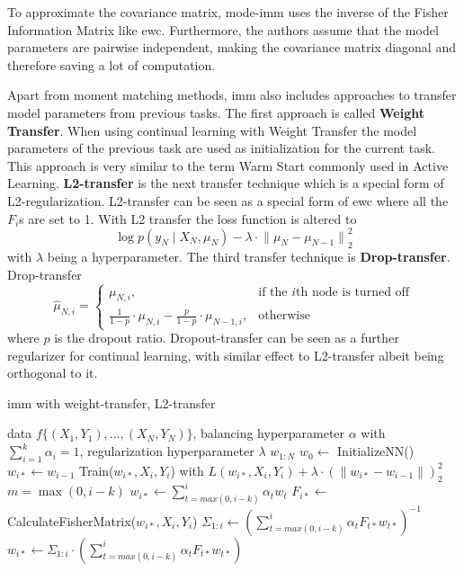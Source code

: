 To approximate the covariance matrix, mode-\gls{imm} uses the inverse of the Fisher Information Matrix like \gls{ewc}. Furthermore, the authors assume that
the model parameters are pairwise independent, making the covariance matrix diagonal and therefore saving a lot of computation. \par
Apart from moment matching methods, \gls{imm} also includes approaches to transfer model parameters from previous tasks. The first approach is called
\textbf{Weight Transfer}. When using continual learning with Weight Transfer the model parameters of the previous task are used as initialization for the
current task. This approach is very similar to the term Warm Start commonly used in Active Learning. \textbf{L2-transfer} is the next transfer technique
which is a special form of L2-regularization. L2-transfer can be seen as a special form of \gls{ewc} where all the $F_i$s are set to 1. With L2 transfer the loss
function is altered to 
\begin{equation}
    \log p(y_N \mid X_N, \mu_N) - \lambda \cdot {\lVert \mu_N - \mu_{N-1} \rVert}^2_2
\end{equation}
with $\lambda$ being a hyperparameter. The third transfer technique is \textbf{Drop-transfer}. Drop-transfer
\begin{equation}
    \hat{\mu}_{N,i} = \begin{cases} \mu_{N,i}, & \text{if the }i \text{th node is turned off} \\
    \frac{1}{1-p} \cdot \mu_{N,i} - \frac{p}{1-p} \cdot \mu_{N-1,i}, & \text{otherwise}  \end{cases}
\end{equation}
where $p$ is the dropout ratio. Dropout-transfer can be seen as a further regularizer for continual learning, with similar effect to L2-transfer albeit
being orthogonal to it.
\begin{algorithm}
    \caption{\gls{imm} with weight-transfer, L2-transfer} \label{alg:IMM}
    \begin{algorithmic}
        \Require data $f\{ (X_1,Y_1),\ldots,(X_N,Y_N)\}$, balancing hyperparameter $\alpha$ with $\sum_{i=1}^k \alpha_i = 1$,
        regularization hyperparameter $\lambda$
        \return $w_{1:N}$
        \State $w_0 \leftarrow $ InitializeNN()
            \State $w_{i*} \leftarrow w_{i-1}$
            \State Train($w_{i*},X_i,Y_i$) with $L(w_{i*},X_i,Y_i) + \lambda \cdot (\lVert w_{i*} - w_{i-1} \rVert)^2_2$
            \State $m=\max (0,i-k)$
            \State $w_{i*} \leftarrow \sum_{t=max(0,i-k)}^i \alpha_t w_{t}$
            \State $F_{i*} \leftarrow$ CalculateFisherMatrix($w_{i*},X_i,Y_i$)
            \State $\Sigma_{1:i} \leftarrow (\sum_{t=max(0,i-k)}^i \alpha_t F_{t*} w_{t*})^{-1}$
            \State $w_{i*} \leftarrow \Sigma_{1:i} \cdot (\sum_{t=max(0,i-k)}^i \alpha_t F_{t*} w_{t*})$
            \EndIf
        \EndFor
    \end{algorithmic}
\end{algorithm}

